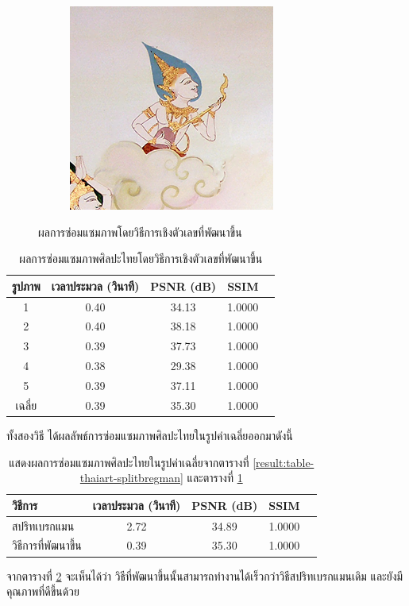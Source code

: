 \begin{figure}[H]
\begin{subfigure}{0.4\linewidth}
			\includegraphics[width=0.8\linewidth]{image/result_ex4/multisplitbergman_case05.png}			
		\end{subfigure}
		\caption{ผลการซ่อมแซมภาพโดยวิธีการเชิงตัวเลขที่พัฒนาขึ้น}
	\end{figure}
		\begin{table}[H]
		\centering
		\begin{tabular}[ht]{|c|c|c|c|c|}
			\hline
			รูปภาพ &เวลาประมวล  (วินาที) & PSNR (dB) & SSIM \\
			\hline
			1 & 0.40 & 34.13 & 1.0000 \\ 
			2 & 0.40 & 38.18 & 1.0000 \\
			3 &  0.39 & 37.73 & 1.0000 \\
			4 & 0.38  & 29.38  & 1.0000 \\
			5 & 0.39  & 37.11  & 1.0000 \\
			\hline
			เฉลี่ย & 0.39  & 35.30  & 1.0000 \\
			\hline
		\end{tabular}
		\caption{ผลการซ่อมแซมภาพศิลปะไทยโดยวิธีการเชิงตัวเลขที่พัฒนาขึ้น}
		\label{result:table-thaiart-mutisplitbregman}
	\end{table}	 
	\hspace{1cm}ทั้งสองวิธี ได้ผลลัพธ์การซ่อมแซมภาพศิลปะไทยในรูปค่าเฉลี่ยออกมาดังนี้
	\begin{table}[H]
		\centering
		\begin{tabular}[ht]{|l|c|c|c|c|}
			\hline
			วิธีการ  & เวลาประมวล  (วินาที) & PSNR (dB) & SSIM \\
			\hline
			สปริทเบรกแมน & 2.72 & 34.89 & 1.0000 \\ 
			วิธีการที่พัฒนาขึ้น & 0.39 & 35.30 & 1.0000 \\
			\hline
		\end{tabular}
		\caption{แสดงผลการซ่อมแซมภาพศิลปะไทยในรูปค่าเฉลี่ยจากตารางที่ 		\ref{result:table-thaiart-splitbregman} และตารางที่ 		\ref{result:table-thaiart-mutisplitbregman} }
		\label{result:table-thaiart-summary}
	\end{table}	
	\hspace{1cm} จากตารางที่ \ref{result:table-thaiart-summary} จะเห็นได้ว่า วิธีที่พัฒนาขึ้นนั้นสามารถทำงานได้เร็วกว่าวิธีสปริทเบรกแมนเดิม และยังมีคุณภาพที่ดีขึ้นด้วย


